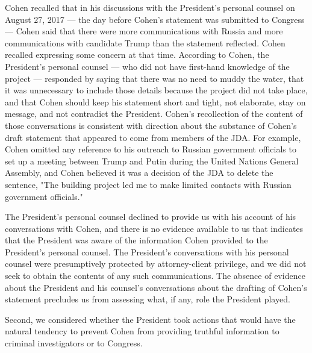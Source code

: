 Cohen recalled that in his discussions with the President's personal counsel on August 27, 2017 — the day before Cohen's statement was submitted to Congress — Cohen said that there were more communications with Russia and more communications with candidate Trump than the statement reflected.
Cohen recalled expressing some concern at that time.
According to Cohen, the President's personal counsel — who did not have first-hand knowledge of the project — responded by saying that there was no need to muddy the water, that it was unnecessary to include those details because the project did not take place, and that Cohen should keep his statement short and tight, not elaborate, stay on message, and not contradict the President.
Cohen's recollection of the content of those conversations is consistent with direction about the substance of Cohen's draft statement that appeared to come from members of the JDA.
For example, Cohen omitted any reference to his outreach to Russian government officials to set up a meeting between Trump and Putin during the United Nations General Assembly, and Cohen believed it was a decision of the JDA to delete the sentence, "The building project led me to make limited contacts with Russian government officials."

The President's personal counsel declined to provide us with his account of his conversations with Cohen, and there is no evidence available to us that indicates that the President was aware of the information Cohen provided to the President's personal counsel.
The President's conversations with his personal counsel were presumptively protected by attorney-client privilege, and we did not seek to obtain the contents of any such communications.
The absence of evidence about the President and his counsel's conversations about the drafting of Cohen's statement precludes us from assessing what, if any, role the President played.

Second, we considered whether the President took actions that would have the natural tendency to prevent Cohen from providing truthful information to criminal investigators or to Congress.

